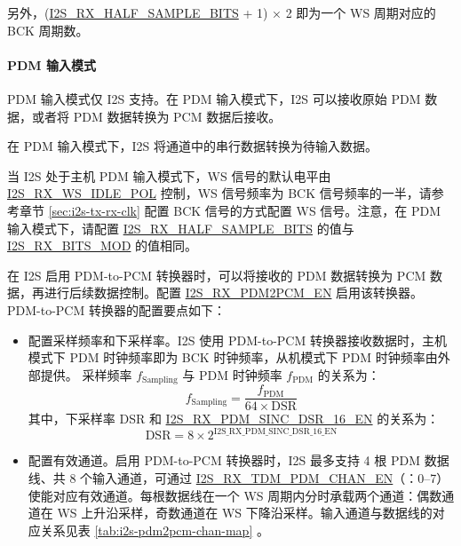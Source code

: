 \documentclass[main\_\_CN.tex]{subfiles}
\begin{document}
另外，(\hyperref[fielddesc:I2SRXHALFSAMPLEBITS]{I2S\_RX\_HALF\_SAMPLE\_BITS} + 1) × 2 即为一个 WS 周期对应的 BCK 周期数。

\paragraph{PDM 输入模式} 

PDM 输入模式仅 I2S 支持。在 PDM 输入模式下，I2S 可以接收原始 PDM 数据，或者将 PDM 数据转换为 PCM 数据后接收。

在 PDM 输入模式下，I2S 将通道中的串行数据转换为待输入数据。

当 I2S 处于主机 PDM 输入模式下，WS 信号的默认电平由 \hyperref[fielddesc:I2SRXWSIDLEPOL]{I2S\_RX\_WS\_IDLE\_POL} 控制，WS 信号频率为 BCK 信号频率的一半，请参考章节 \ref{sec:i2s-tx-rx-clk} \textit{} 配置 BCK 信号的方式配置 WS 信号。注意，在 PDM 输入模式下，请配置 \hyperref[fielddesc:I2SRXHALFSAMPLEBITS]{I2S\_RX\_HALF\_SAMPLE\_BITS} 的值与 \hyperref[fielddesc:I2SRXBITSMOD]{I2S\_RX\_BITS\_MOD} 的值相同。

在 I2S 启用 PDM-to-PCM 转换器时，可以将接收的 PDM 数据转换为 PCM 数据，再进行后续数据控制。配置 \hyperref[fielddesc:I2SRXPDM2PCMEN]{I2S\_RX\_PDM2PCM\_EN} 启用该转换器。PDM-to-PCM 转换器的配置要点如下：

\begin{itemize}
    \item 配置采样频率和下采样率。I2S 使用 PDM-to-PCM 转换器接收数据时，主机模式下 PDM 时钟频率即为 BCK 时钟频率，从机模式下 PDM 时钟频率由外部提供。    采样频率 $f_{\mathrm{Sampling}}$ 与 PDM 时钟频率 $f_{\mathrm{PDM}}$ 的关系为：
    $$f_{\mathrm{Sampling}} = \frac{f_{\mathrm{PDM}}}{\mathrm{64 \times DSR}}$$
    其中，下采样率 DSR 和 \hyperref[fielddesc:I2SRXPDMSINCDSR16EN]{I2S\_RX\_PDM\_SINC\_DSR\_16\_EN} 的关系为：
    $$\mathrm{DSR} = 8 \times 2^{\mathrm{\hyperref[fielddesc:I2SRXPDMSINCDSR16EN]{I2S\_RX\_PDM\_SINC\_DSR\_16\_EN}}}$$
    \item 配置有效通道。启用 PDM-to-PCM 转换器时，I2S 最多支持 4 根 PDM 数据线、共 8 个输入通道，可通过 \hyperref[fielddesc:I2SRXTDMPDMCHAN0EN]{I2S\_RX\_TDM\_PDM\_CHAN\_EN}（：0--7）使能对应有效通道。每根数据线在一个 WS 周期内分时承载两个通道：偶数通道在 WS 上升沿采样，奇数通道在 WS 下降沿采样。输入通道与数据线的对应关系见表 \ref{tab:i2s-pdm2pcm-chan-map} \textit{}。
\end{itemize}
\end{document}
